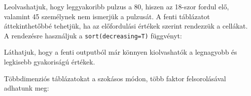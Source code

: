 \documentclass[
]{book}
\newenvironment{Shaded}{\begin{snugshade}}{\end{snugshade}}
\newcommand{\AttributeTok}[1]{\textcolor[rgb]{0.77,0.63,0.00}{#1}}
\newcommand{\CommentTok}[1]{\textcolor[rgb]{0.56,0.35,0.01}{\textit{#1}}}
\newcommand{\FunctionTok}[1]{\textcolor[rgb]{0.00,0.00,0.00}{#1}}
\newcommand{\NormalTok}[1]{#1}
\newcommand{\SpecialCharTok}[1]{\textcolor[rgb]{0.00,0.00,0.00}{#1}}
\newcommand{\StringTok}[1]{\textcolor[rgb]{0.31,0.60,0.02}{#1}}
\begin{document}
Leolvashatjuk, hogy leggyakoribb pulzus a 80, hiszen az 18-szor fordul elő, valamint 45 személynek nem ismerjük a pulzusát. A fenti táblázatot áttekinthetőbbé tehetjük, ha az előfordulási értékek szerint rendezzük a cellákat. A rendezésre használjuk a \texttt{sort(decreasing=T)} függvényt:

\begin{Shaded}
\end{Shaded}

Láthatjuk, hogy a fenti outputból már könnyen kiolvashatók a legnagyobb és legkisebb gyakoriságú értékek.

Többdimenziós táblázatokat a szokásos módon, több faktor felsorolásával adhatunk meg:
\end{document}
